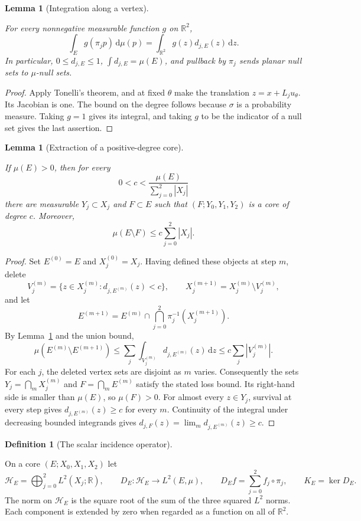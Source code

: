 \documentclass[11pt]{amsart}
\newcommand{\R}{\mathbb R}
\newcommand{\dd}{\,\mathrm d}
\newtheorem{lemma}[theorem]{Lemma}
\theoremstyle{definition}
\newtheorem{definition}[theorem]{Definition}
\theoremstyle{remark}
\numberwithin{equation}{section}
\providecommand{\lean}[1]{}
\providecommand{\leanok}{}
\begin{document}
\begin{lemma}[Integration along a vertex]\label{rig:degree-integration}
\lean{Auto.rig_degree_integration,Auto.rig_degree_integration_bounds,Auto.rig_degree_integration_total,Auto.rig_degree_integration_null}
\leanok
For every nonnegative measurable function $g$ on $\R^2$,
\[
 \int_E g(\pi_jp)\dd\mu(p)
 =\int_{\R^2}g(z)d_{j,E}(z)\dd z.
\]
In particular, $0\le d_{j,E}\le1$,
$\int d_{j,E}=\mu(E)$, and pullback by $\pi_j$ sends planar null sets
to $\mu$-null sets.
\end{lemma}
\begin{proof}
Apply Tonelli's theorem, and at fixed $\theta$ make the translation
$z=x+L_ju_\theta$. Its Jacobian is one. The bound on the degree follows
because $\sigma$ is a probability measure. Taking $g=1$ gives its integral,
and taking $g$ to be the indicator of a null set gives the last assertion.
\end{proof}

\begin{lemma}[Extraction of a positive-degree core]\label{rig:prune}
\lean{Auto.rig_prune}
\leanok
If $\mu(E)>0$, then for every
\[
 0<c<\frac{\mu(E)}{\sum_{j=0}^2|X_j|}
\]
there are measurable $Y_j\subset X_j$ and $F\subset E$ such that
$(F;Y_0,Y_1,Y_2)$ is a core of degree $c$. Moreover,
\[
 \mu(E\setminus F)\le c\sum_{j=0}^2|X_j|.
\]
\end{lemma}
\begin{proof}
Set $E^{(0)}=E$ and $X_j^{(0)}=X_j$. Having defined these objects at
step $m$, delete
\[
 V_j^{(m)}=\{z\in X_j^{(m)}:d_{j,E^{(m)}}(z)<c\},
 \qquad X_j^{(m+1)}=X_j^{(m)}\setminus V_j^{(m)},
\]
and let
\[
 E^{(m+1)}=E^{(m)}\cap
 \bigcap_{j=0}^2\pi_j^{-1}(X_j^{(m+1)}).
\]
By Lemma~\ref{rig:degree-integration} and the union bound,
\[
 \mu(E^{(m)}\setminus E^{(m+1)})
 \le\sum_j\int_{V_j^{(m)}}d_{j,E^{(m)}}(z)\dd z
 \le c\sum_j|V_j^{(m)}|.
\]
For each $j$, the deleted vertex sets are disjoint as $m$ varies.
Consequently the sets
$Y_j=\bigcap_mX_j^{(m)}$ and $F=\bigcap_mE^{(m)}$ satisfy the stated loss
bound. Its right-hand side is smaller than $\mu(E)$, so $\mu(F)>0$.
For almost every $z\in Y_j$, survival at every step gives
$d_{j,E^{(m)}}(z)\ge c$ for every $m$. Continuity of the integral under
decreasing bounded integrands gives
$d_{j,F}(z)=\lim_m d_{j,E^{(m)}}(z)\ge c$.
\end{proof}

\begin{definition}[The scalar incidence operator]\label{rig:def-kernel}
\lean{Auto.HE,Auto.incidenceOp,Auto.incidenceOp_ae,Auto.kernelSpace}
On a core $(E;X_0,X_1,X_2)$ let
\[
 \mathcal H_E=\bigoplus_{j=0}^2L^2(X_j;\R),\qquad
 D_E:\mathcal H_E\longrightarrow L^2(E,\mu),\qquad
 D_E f=\sum_{j=0}^2 f_j\circ\pi_j,
 \qquad K_E=\ker D_E.
\]
The norm on $\mathcal H_E$ is the square root of the sum of the three
squared $L^2$ norms. Each component is extended by zero when regarded as
a function on all of $\R^2$.
\end{definition}
\end{document}
